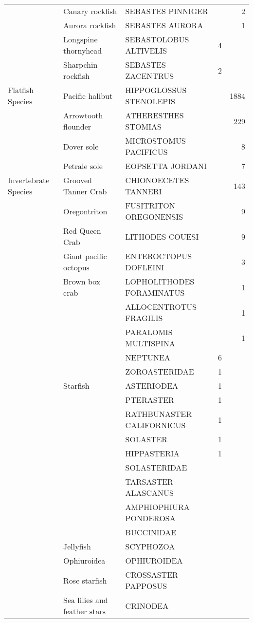 \documentclass[12pt]{article}\usepackage[]{graphicx}\usepackage[]{color}
\begin{document}
\begin{table}[!h]
\begin{tabular}[t]{lllrr}
 & Canary rockfish & SEBASTES PINNIGER &  & 2\\
 & Aurora rockfish & SEBASTES AURORA &  & 1\\
 & Longspine thornyhead & SEBASTOLOBUS ALTIVELIS & 4 & \\
 & Sharpchin rockfish & SEBASTES ZACENTRUS & 2 & \\
\hline
Flatfish Species & Pacific halibut & HIPPOGLOSSUS STENOLEPIS &  & 1884\\
 & Arrowtooth flounder & ATHERESTHES STOMIAS &  & 229\\
 & Dover sole & MICROSTOMUS PACIFICUS &  & 8\\
 & Petrale sole & EOPSETTA JORDANI &  & 7\\
\hline
Invertebrate Species & Grooved Tanner Crab & CHIONOECETES TANNERI &  & 143\\
 & Oregontriton & FUSITRITON OREGONENSIS &  & 9\\
 & Red Queen Crab & LITHODES COUESI &  & 9\\
 & Giant pacific octopus & ENTEROCTOPUS DOFLEINI &  & 3\\
 & Brown box crab & LOPHOLITHODES FORAMINATUS &  & 1\\
 &  & ALLOCENTROTUS FRAGILIS &  & 1\\
 &  & PARALOMIS MULTISPINA &  & 1\\
 &  & NEPTUNEA & 6 & \\
 &  & ZOROASTERIDAE & 1 & \\
 & Starfish & ASTERIODEA & 1 & \\
 &  & PTERASTER & 1 & \\
 &  & RATHBUNASTER CALIFORNICUS & 1 & \\
 &  & SOLASTER & 1 & \\
 &  & HIPPASTERIA & 1 & \\
 &  & SOLASTERIDAE &  & \\
 &  & TARSASTER ALASCANUS &  & \\
 &  & AMPHIOPHIURA PONDEROSA &  & \\
 &  & BUCCINIDAE &  & \\
 & Jellyfish & SCYPHOZOA &  & \\
 & Ophiuroidea & OPHIUROIDEA &  & \\
 & Rose starfish & CROSSASTER PAPPOSUS &  & \\
 & Sea lilies and feather stars & CRINODEA &  & \\
\bottomrule
\end{tabular}
\end{table}
\clearpage
\end{document}
